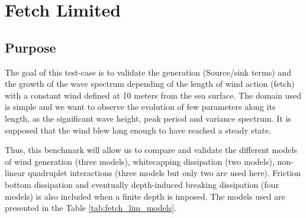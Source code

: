 \chapter{Fetch Limited }

\section{Purpose}
The goal of this test-case is to validate the generation (Source/sink terms)
and the growth of the wave spectrum depending of the length of wind action
(fetch) with a constant wind defined at 10 meters from the sea surface. The
domain used is simple and we want to observe the evolution of few parameters
along its length, as the significant wave height, peak period and variance
spectrum. It is supposed that the wind blew long enough to have reached a
steady state.

Thus, this benchmark will allow us to compare and validate the different models
of wind generation (three models), whitecapping dissipation (two models),
non-linear quadruplet interactions (three models but only two are used here).
Friction bottom dissipation and eventually depth-induced breaking dissipation
(four models) is also included when a finite depth is imposed. The models used
are presented in the Table \ref{tab:fetch_lim_models}.

